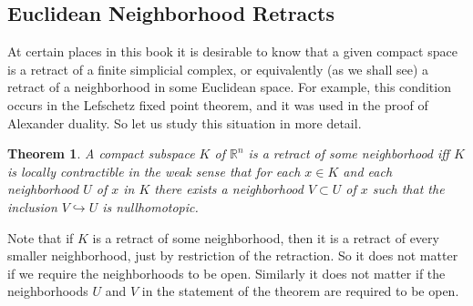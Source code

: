 \documentclass{article}
\newtheorem{theorem}{Theorem}[section]
\theoremstyle{definition}
\begin{document}
\subsection*{Euclidean Neighborhood Retracts}

At certain places in this book it is desirable to know that a given compact space is a retract of a finite simplicial complex, or equivalently (as we shall see) a retract of a neighborhood in some Euclidean space. For example, this condition occurs in the Lefschetz fixed point theorem, and it was used in the proof of Alexander duality. So let us study this situation in more detail.

\begin{theorem}
A compact subspace $K$ of $\mathbb{R}^n$ is a retract of some neighborhood iff $K$ is locally contractible in the weak sense that for each $x \in K$ and each neighborhood $U$ of $x$ in $K$ there exists a neighborhood $V \subset U$ of $x$ such that the inclusion $V \hookrightarrow U$ is nullhomotopic.
\end{theorem}

Note that if $K$ is a retract of some neighborhood, then it is a retract of every smaller neighborhood, just by restriction of the retraction. So it does not matter if we require the neighborhoods to be open. Similarly it does not matter if the neighborhoods $U$ and $V$ in the statement of the theorem are required to be open.
\end{document}
